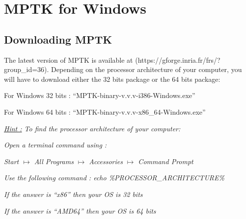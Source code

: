 \chapter{MPTK for Windows \label{MptkForWin}}

\section{Downloading MPTK}

The latest version of MPTK is available at (https://gforge.inria.fr/frs/?group\_id=36). Depending on the processor architecture of 
your computer, you will have to download either the 32 bits package or the 64 bits package:
\begin{my_itemize}
	\item For Windows 32 bits : ``MPTK-binary-v.v.v-i386-Windows.exe''
	\item For Windows 64 bits : ``MPTK-binary-v.v.v-x86\_64-Windows.exe''
\end{my_itemize}

\noindent \emph{\underline{Hint :} To find the processor architecture of your computer:}
\begin{my_itemize}
	\item \emph{Open a terminal command using :}
	\begin{my_itemize}
		\item \emph{Start $\mapsto$ All Programs $\mapsto$ Accessories $\mapsto$ Command Prompt}
	\end{my_itemize}
	\item \emph{Use the following command : \textcolor[rgb]{0.4,0.4,0.4}{echo \%PROCESSOR\_ARCHITECTURE\%}}
	\begin{my_itemize}
		\item \emph{If the answer is ``x86'' then your OS is 32 bits}
		\item \emph{If the answer is ``AMD64'' then your OS is 64 bits}
	\end{my_itemize}
\end{my_itemize}

